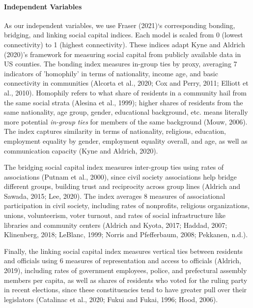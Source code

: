 \documentclass[]{elsarticle} %
\begin{document}
\hypertarget{independent-variables}{%
\paragraph{Independent Variables}\label{independent-variables}}

As our independent variables, we use Fraser (2021)`s corresponding
bonding, bridging, and linking social capital indices. Each model is
scaled from 0 (lowest connectivity) to 1 (highest connectivity). These
indices adapt Kyne and Aldrich (2020)'s framework for measuring social
capital from publicly available data in US counties. The bonding index
measures in-group ties by proxy, averaging 7 indicators of 'homophily'
in terms of nationality, income age, and basic connectivity in
communities (Alcorta et al., 2020; Cox and Perry, 2011; Elliott et al.,
2010). Homophily refers to what share of residents in a community hail
from the same social strata (Alesina et al., 1999); higher shares of
residents from the same nationality, age group, gender, educational
background, etc. means literally more potential \emph{in-group ties} for
members of the same background (Mouw, 2006). The index captures
similarity in terms of nationality, religious, education, employment
equality by gender, employment equality overall, and age, as well as
communication capacity (Kyne and Aldrich, 2020).

The bridging social capital index measures inter-group ties using rates
of associations (Putnam et al., 2000), since civil society associations
help bridge different groups, building trust and reciprocity across
group lines (Aldrich and Sawada, 2015; Lee, 2020). The index averages 8
measures of associational participation in civil society, including
rates of nonprofits, religious organizations, unions, volunteerism,
voter turnout, and rates of social infrastructure like libraries and
community centers (Aldrich and Kyota, 2017; Haddad, 2007; Klinenberg,
2018; LeBlanc, 1999; Norris and Pfefferbaum, 2008; Pekkanen, n.d.).

Finally, the linking social capital index measures vertical ties between
residents and officials using 6 measures of representation and access to
officials (Aldrich, 2019), including rates of government employees,
police, and prefectural assembly members per capita, as well as shares
of residents who voted for the ruling party in recent elections, since
these constituencies tend to have greater pull over their legislators
(Catalinac et al., 2020; Fukui and Fukai, 1996; Hood, 2006).
\end{document}
